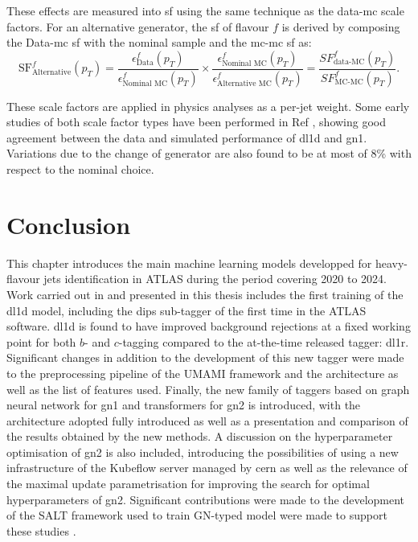 \begin{itemize}
  These effects are measured into \gls{sf} using the same technique as the data-\gls{mc} scale factors. For an alternative generator, the \gls{sf} of flavour $f$ is derived by composing the Data-\gls{mc} \gls{sf} with the nominal sample and the \gls{mc}-\gls{mc} \gls{sf} as: \[\textrm{SF}^f_{\textrm{Alternative}}(p_T) = \frac{\epsilon^f_{\textrm{Data}}(p_T)}{\epsilon^f_{\textrm{Nominal MC}}(p_T)} \times \frac{\epsilon^f_{\textrm{Nominal MC}}(p_T)}{\epsilon^f_{\textrm{Alternative MC}}(p_T)} = \frac{SF^f_{\textrm{data-MC}}(p_T)}{SF^f_{\textrm{MC-MC}}(p_T)}.\] 
\end{itemize}
These scale factors are applied in physics analyses as a per-jet weight. Some early studies of both scale factor types have been performed in Ref \cite{ATL-PLOT-FTAG-2023-01}, showing good agreement between the data and simulated performance of \gls{dl1d} and \gls{gn1}. Variations due to the change of generator are also found to be at most of 8\% with respect to the nominal choice.

\section{Conclusion}
This chapter introduces the main machine learning models developped for heavy-flavour jets identification in ATLAS during the period covering 2020 to 2024. Work carried out in and presented in this thesis includes the first training of the \gls{dl1d} model, including the \gls{dips} sub-tagger of the first time in the ATLAS software. \gls{dl1d} is found to have improved background rejections at a fixed working point for both $b$- and $c$-tagging compared to the at-the-time released tagger: \gls{dl1r}. Significant changes in addition to the development of this new tagger were made to the preprocessing pipeline of the \uppercase{Umami} framework \cite{UmamiCite} and the architecture as well as the list of features used. Finally, the new family of taggers based on graph neural network for \gls{gn1} and transformers for \gls{gn2} is introduced, with the architecture adopted fully introduced as well as a presentation and comparison of the results obtained by the new methods. A discussion on the hyperparameter optimisation of \gls{gn2} is also included, introducing the possibilities of using a new infrastructure of the Kubeflow server managed by \gls{cern} as well as the relevance of the maximal update parametrisation for improving the search for optimal hyperparameters of \gls{gn2}. Significant contributions were made to the development of the \uppercase{Salt} framework used to train GN-typed model were made to support these studies \cite{SaltCite}. 

